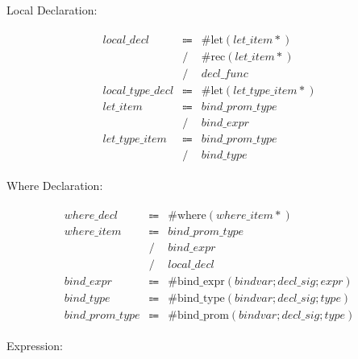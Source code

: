 Local Declaration:

\begin{align*}
    \begin{array}{rcll}
        \mathit{local\_decl}
        &\Coloneq &\mathrm{\#let}(\mathit{let\_item}{*}) \\
        &\mathrel{/} &\mathrm{\#rec}(\mathit{let\_item}{*}) \\
        &\mathrel{/} &\mathit{decl\_func} \\
        \mathit{local\_type\_decl}
        &\Coloneq &\mathrm{\#let}(\mathit{let\_type\_item}{*}) \\
        \mathit{let\_item}
        &\Coloneq &\mathit{bind\_prom\_type} \\
        &\mathrel{/} &\mathit{bind\_expr} \\
        \mathit{let\_type\_item}
        &\Coloneq &\mathit{bind\_prom\_type} \\
        &\mathrel{/} &\mathit{bind\_type}
    \end{array}
\end{align*}

Where Declaration:

\begin{align*}
    \begin{array}{rcll}
        \mathit{where\_decl}
        &\Coloneq &\mathrm{\#where}(\mathit{where\_item}{*}) \\
        \mathit{where\_item}
        &\Coloneq &\mathit{bind\_prom\_type} \\
        &\mathrel{/} &\mathit{bind\_expr} \\
        &\mathrel{/} &\mathit{local\_decl} \\
        \mathit{bind\_expr}
        &\Coloneq &\mathrm{\#bind\_expr}(\mathit{bindvar}; \mathit{decl\_sig}; \mathit{expr}) \\
        \mathit{bind\_type}
        &\Coloneq &\mathrm{\#bind\_type}(\mathit{bindvar}; \mathit{decl\_sig}; \mathit{type}) \\
        \mathit{bind\_prom\_type}
        &\Coloneq &\mathrm{\#bind\_prom}(\mathit{bindvar}; \mathit{decl\_sig}; \mathit{type})
    \end{array}
\end{align*}

Expression:


